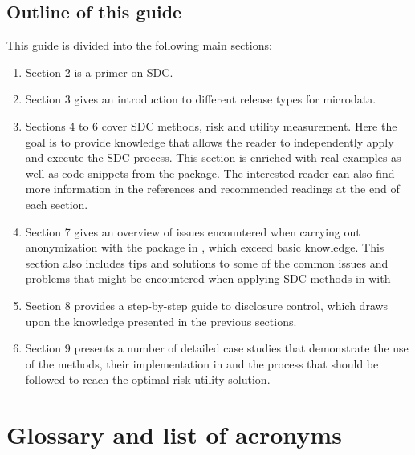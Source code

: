 \documentclass[letterpaper,10pt,english]{sphinxmanual}
\begin{document}
\section{Outline of this guide}
\label{\detokenize{intro:outline-of-this-guide}}
This guide is divided into the following main sections:
\begin{enumerate}
\item {} 
Section 2 is a primer on SDC.

\item {} 
Section 3 gives an introduction to different release types for
microdata.

\item {} 
Sections 4 to 6 cover SDC methods, risk and utility measurement.
Here the goal is to provide knowledge that allows the reader to
independently apply and execute the SDC process. This section is
enriched with real examples as well as code snippets from the
 package. The interested reader can also find more
information in the references and recommended readings at the end
of each section.

\item {} 
Section 7 gives an overview of issues encountered when carrying
out anonymization with the  package in , which exceed
basic  knowledge. This section also includes tips and solutions
to some of the common issues and problems that might be
encountered when applying SDC methods in  with 

\item {} 
Section 8 provides a step-by-step guide to disclosure control,
which draws upon the knowledge presented in the previous sections.

\item {} 
Section 9 presents a number of detailed case studies that
demonstrate the use of the methods, their implementation in
 and the process that should be followed to reach the
optimal risk-utility solution.

\end{enumerate}


\chapter{Glossary and list of acronyms}
\label{\detokenize{glossary_acr::doc}}\label{\detokenize{glossary_acr:glossary-and-list-of-acronyms}}
\end{document}
